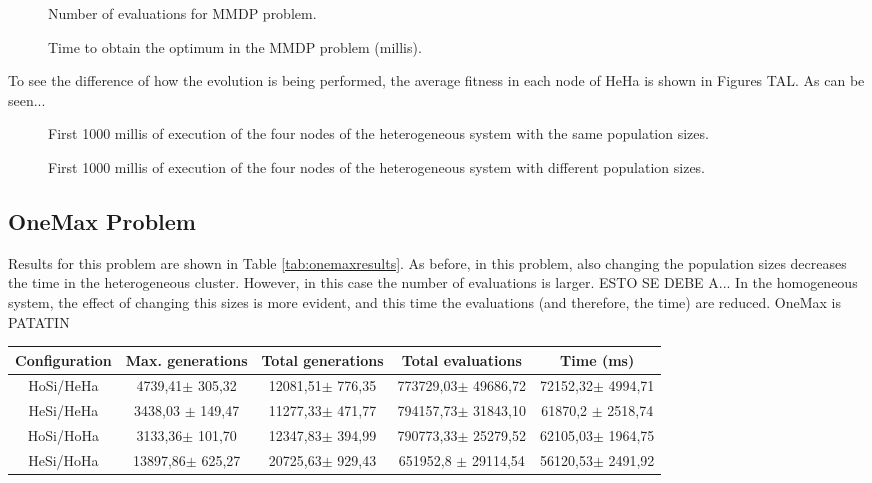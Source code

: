 \documentclass{sig-alternate}
\begin{document}
\begin{figure}
\centering
{}
\caption{Number of evaluations for MMDP problem.}
\label{fig:evalsMMDP}
\end{figure}

\begin{figure}
\centering
{}
\caption{Time to obtain the optimum in the MMDP problem (millis).}
\label{fig:timeMMDP}
\end{figure}

To see the difference of how the evolution is being performed, the average fitness in each node of HeHa is shown in Figures TAL. As can be seen...

\begin{figure}
\centering
{}
\caption{First 1000 millis of execution of the four nodes of the heterogeneous system with the same population sizes.}
\end{figure}

\begin{figure}
\centering
{}
\caption{First 1000 millis of execution of the four nodes of the heterogeneous system with different population sizes.}
\end{figure}

\subsection{OneMax Problem}

Results for this problem are shown in Table \ref{tab:onemaxresults}. As before, in this problem, also changing the population sizes decreases the time in the heterogeneous cluster. However, in this case the number of evaluations is larger. ESTO SE DEBE A... In the homogeneous system, the effect of changing this sizes is more evident, and this time the evaluations (and therefore, the time) are reduced. OneMax is PATATIN

\begin{table*}
\centering
\caption{Results for the OneMax problem.}
\begin{tabular}{|c|c|c|c|c|} \hline
Configuration	& Max. generations			& Total generations			& 	Total evaluations			& Time (ms) \\ \hline
HoSi/HeHa		& 4739,41$\pm$	305,32 		&	12081,51$\pm$	776,35 	&	773729,03$\pm$	49686,72 	&	72152,32$\pm$	4994,71 \\ \hline
HeSi/HeHa		&	3438,03 $\pm$	149,47 &	11277,33$\pm$	471,77 &	794157,73$\pm$	31843,10 	&	61870,2	$\pm$ 2518,74 \\ \hline
HoSi/HoHa		&	3133,36$\pm$	101,70 	&	12347,83$\pm$	394,99 	&	790773,33$\pm$	25279,52 	&	62105,03$\pm$	1964,75 \\ \hline
HeSi/HoHa		& 13897,86$\pm$	625,27 		&	20725,63$\pm$	929,43 	&	651952,8 $\pm$	29114,54	&	56120,53$\pm$	2491,92 \\ \hline
\end{tabular}
\label{tab:onemaxresults}
\end{table*}
\end{document}
